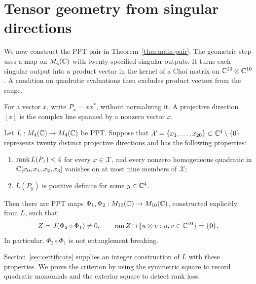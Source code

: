 \section{Tensor geometry from singular directions}
\label{sec:geometry}

We now construct the PPT pair in Theorem~\ref{thm:main-pair}.  The geometric
step uses a map on $M_{4}(\mathbb C)$ with twenty specified singular outputs.  It turns
each singular output into a product vector in the kernel of a Choi matrix
on $\mathbb C^{10}\otimes\mathbb C^{10}$.  A condition on quadratic evaluations then
excludes product vectors from the range.

For a vector $x$, write $P_x=xx^*$, without normalizing it.  A projective
direction $[x]$ is the complex line spanned by a nonzero vector $x$.

\begin{proposition}\label{prop:tensor-criterion}
Let $L:M_{4}(\mathbb C)\to M_{4}(\mathbb C)$ be PPT.  Suppose that
$\mathcal X=\{x_1,\ldots,x_{20}\}\subset\mathbb C^4\setminus\{0\}$ represents
twenty distinct projective directions and has the following properties:
\begin{enumerate}
\item $\operatorname{rank} L(P_x)<4$ for every $x\in\mathcal X$, and every nonzero
homogeneous quadratic in $\mathbb C[x_0,x_1,x_2,x_3]$ vanishes on at most nine
members of $\mathcal X$;
\item $L(P_y)$ is positive definite for some $y\in\mathbb C^4$.
\end{enumerate}
Then there are PPT maps $\Phi_1,\Phi_2:M_{10}(\mathbb C)\to M_{10}(\mathbb C)$, constructed
explicitly from $L$, such that
\[
 Z=J(\Phi_2\circ\Phi_1)\ne0,\qquad
 \operatorname{ran} Z\cap\{u\otimes v:u,v\in\mathbb C^{10}\}=\{0\}.
\]
In particular, $\Phi_2\circ\Phi_1$ is not entanglement breaking.
\end{proposition}

Section~\ref{sec:certificate} supplies an integer construction of $L$ with
these properties.  We prove the criterion by using the symmetric square to
record quadratic monomials and the exterior square to detect rank loss.

